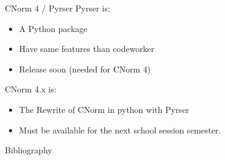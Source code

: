 \documentclass[xcolor={usenames,svgnames}]{beamer}
\begin{document}
\begin{frame}{CNorm 4 / Pyrser}
Pyrser is:
\begin{itemize}
\item A Python package
\item Have same features than codeworker
\item Release soon (needed for CNorm 4)
\end{itemize}
CNorm 4.x is:
\begin{itemize}
\item The Rewrite of CNorm in python with Pyrser
\item Must be available for the next school session semester.
\end{itemize}
\end{frame}

\begin{frame}{Bibliography}
\rtxbibliography
\end{frame}
\end{document}

